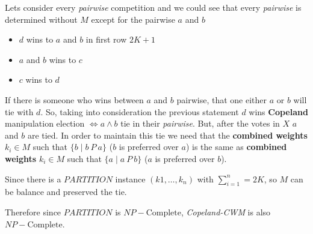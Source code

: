 \documentclass[12pt, a4paper]{article}
\begin{document}
Lets consider every \textit{pairwise} competition and we could see that every \textit{pairwise} is determined without $M$ except for the pairwise $a$ and $b$

\begin{itemize}
  \item $d$ wins to $a$ and $b$ in first row $2K + 1$
  \item $a$ and $b$ wins to $c$
  \item $c$ wins to $d$
\end{itemize}

If there is someone who wins between $a$ and $b$ pairwise, that one either $a$ or $b$ will tie with $d$.
So, taking into consideration the previous statement $d$ wins \textbf{Copeland} manipulation election $\iff a \land b$ tie in their \textit{pairwise}.
But, after the votes in $X$ $a$ and $b$ are tied. In order to maintain this tie we need that the \textbf{combined weights} $k_i \in M$ such that $\{b \mid b\ P\ a\}$ ($b$ is preferred over $a$) 
is the same as \textbf{combined weights} $k_i \in M$ such that $\{a \mid a\ P\ b\}$ ($a$ is preferred over $b$).

Since there is a $PARTITION$ instance $(k1,\dots, k_n)$ with $\sum_{i=1}^n = 2K$, so $M$ can be balance and preserved the tie.

Therefore since $PARTITION$ is $NP-\text{Complete}$, \textit{Copeland-CWM} is also $NP-\text{Complete}$.
\end{document}
